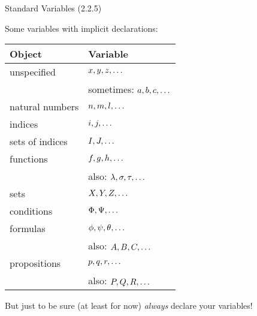 \documentclass[../slides.tex]{subfiles}
\begin{document}
\begin{frame}{Standard Variables (2.2.5)}

Some variables with implicit declarations:

	\begin{center}
	\begin{tabular}{l | l}
			Object & Variable\\\hline
			
			unspecified & $x,y,z,\mathellipsis$\\
			
					& sometimes: $a,b,c, \mathellipsis$\\
			
			natural numbers & $n,m,l,\mathellipsis$\\
			
			indices & $i,j,\mathellipsis$ \\
			
			sets of indices & $I,J,\mathellipsis$\\
			
			functions & $f,g,h,\mathellipsis$\\
			
					& also: $\lambda, \sigma,\tau,\mathellipsis$\\
			
			sets & $X,Y,Z,\mathellipsis$ \\
			
			conditions & $\Phi,\Psi,\mathellipsis$\\
			
			formulas	 & $\phi,\psi,\theta,\mathellipsis$\\
			
					& also: $A,B,C, \mathellipsis$\\
					
			propositions & $p,q,r, \mathellipsis$\\
					& also: $P,Q,R,\mathellipsis$
			
			\end{tabular}
		\end{center}

But just to be sure (at least for now) \emph{always} declare your variables!		
		
\end{frame}
\end{document}
